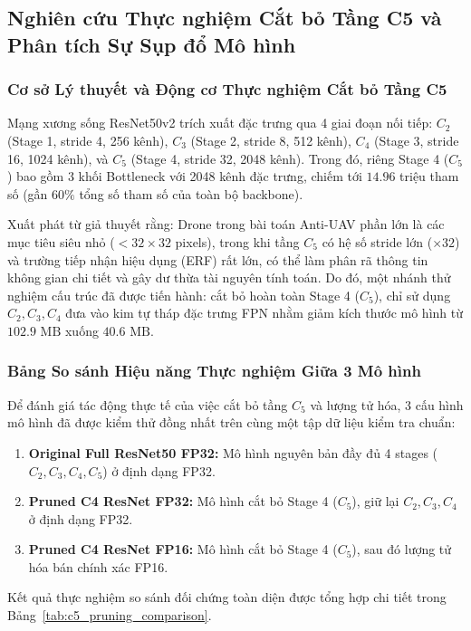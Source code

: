 \documentclass[11pt,a4paper]{article}
\begin{document}
\subsection{Nghiên cứu Thực nghiệm Cắt bỏ Tầng C5 và Phân tích Sự Sụp đổ Mô hình}
\label{subsec:c5_pruning_analysis}

\subsubsection{Cơ sở Lý thuyết và Động cơ Thực nghiệm Cắt bỏ Tầng C5}
Mạng xương sống ResNet50v2 trích xuất đặc trưng qua 4 giai đoạn nối tiếp: $C_2$ (Stage 1, stride 4, 256 kênh), $C_3$ (Stage 2, stride 8, 512 kênh), $C_4$ (Stage 3, stride 16, 1024 kênh), và $C_5$ (Stage 4, stride 32, 2048 kênh).
Trong đó, riêng Stage 4 ($C_5$) bao gồm 3 khối Bottleneck với 2048 kênh đặc trưng, chiếm tới $14.96$ triệu tham số (gần $60\%$ tổng số tham số của toàn bộ backbone).

Xuất phát từ giả thuyết rằng: Drone trong bài toán Anti-UAV phần lớn là các mục tiêu siêu nhỏ ($< 32 \times 32$ pixels), trong khi tầng $C_5$ có hệ số stride lớn ($\times 32$) và trường tiếp nhận hiệu dụng (ERF) rất lớn, có thể làm phân rã thông tin không gian chi tiết và gây dư thừa tài nguyên tính toán. Do đó, một nhánh thử nghiệm cấu trúc đã được tiến hành: cắt bỏ hoàn toàn Stage 4 ($C_5$), chỉ sử dụng $C_2, C_3, C_4$ đưa vào kim tự tháp đặc trưng FPN nhằm giảm kích thước mô hình từ $102.9\text{ MB}$ xuống $40.6\text{ MB}$.

\subsubsection{Bảng So sánh Hiệu năng Thực nghiệm Giữa 3 Mô hình}
Để đánh giá tác động thực tế của việc cắt bỏ tầng $C_5$ và lượng tử hóa, 3 cấu hình mô hình đã được kiểm thử đồng nhất trên cùng một tập dữ liệu kiểm tra chuẩn:
\begin{enumerate}
    \item \textbf{Original Full ResNet50 FP32:} Mô hình nguyên bản đầy đủ 4 stages ($C_2, C_3, C_4, C_5$) ở định dạng FP32.
    \item \textbf{Pruned C4 ResNet FP32:} Mô hình cắt bỏ Stage 4 ($C_5$), giữ lại $C_2, C_3, C_4$ ở định dạng FP32.
    \item \textbf{Pruned C4 ResNet FP16:} Mô hình cắt bỏ Stage 4 ($C_5$), sau đó lượng tử hóa bán chính xác FP16.
\end{enumerate}

Kết quả thực nghiệm so sánh đối chứng toàn diện được tổng hợp chi tiết trong Bảng~\ref{tab:c5_pruning_comparison}.
\end{document}
